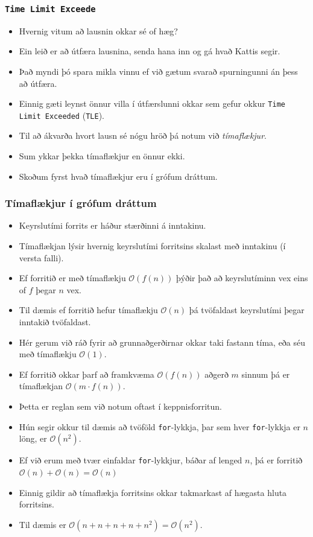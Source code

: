 \documentclass[handout]{beamer}
\newcommand\env[2]
{
	\begin{#1}
	#2
	\end{#1}
}
\begin{document}
\env{frame}
{
	\frametitle{\texttt{Time Limit Exceede}}
	\env{itemize}
	{
		\item<1-> Hvernig vitum að lausnin okkar sé of hæg?
		\item<2-> Ein leið er að útfæra lausnina, senda hana inn og gá hvað Kattis segir.
		\item<3-> Það myndi þó spara mikla vinnu ef við gætum svarað spurningunni án þess að útfæra.
		\item<4-> Einnig gæti leynst önnur villa í útfærslunni okkar sem gefur okkur \texttt{Time Limit Exceeded} (\texttt{TLE}).
		\item<5-> Til að ákvarða hvort lausn sé nógu hröð þá notum við \emph{tímaflækjur}.
		\item<6-> Sum ykkar þekka tímaflækjur en önnur ekki.
		\item<7-> Skoðum fyrst hvað tímaflækjur eru í grófum dráttum.
	}
}

\env{frame}
{
	\frametitle{Tímaflækjur í grófum dráttum}
	\env{itemize}
	{
		\item<1-> Keyrslutími forrits er háður stærðinni á inntakinu.
		\item<2-> Tímaflækjan lýsir hvernig keyrslutími forritsins skalast með inntakinu (í versta falli).
		\item<3-> Ef forritið er með tímaflækju $\mathcal{O}(f(n))$ þýðir það að keyrslutíminn vex eins of $f$ þegar $n$ vex.
		\item<4-> Til dæmis ef forritið hefur tímaflækju $\mathcal{O}(n)$ þá tvöfaldast keyrslutími þegar inntakið tvöfaldast.
		\item<5-> Hér gerum við ráð fyrir að grunnaðgerðirnar okkar taki fastann tíma, eða séu með tímaflækju $\mathcal{O}(1)$.
	}
}

\env{frame}
{
	\env{itemize}
	{
		\item<1-> Ef forritið okkar þarf að framkvæma $\mathcal{O}(f(n))$ aðgerð $m$ sinnum þá er tímaflækjan $\mathcal{O}(m \cdot f(n))$.
		\item<2-> Þetta er reglan sem við notum oftast í keppnisforritun.
		\item<3-> Hún segir okkur til dæmis að tvöföld \texttt{for}-lykkja, þar sem hver \texttt{for}-lykkja er $n$ löng, er $\mathcal{O}(n^2)$.
		\item<4-> Ef við erum með tvær einfaldar \texttt{for}-lykkjur, báðar af lenged $n$, þá er forritið 
			$\mathcal{O}(n) + \mathcal{O}(n) = \mathcal{O}(n)$
		\item<5-> Einnig gildir að tímaflækja forritsins okkar takmarkast af hægasta hluta forritsins.
		\item<6-> Til dæmis er
			$\mathcal{O}(n + n + n + n + n^2) = \mathcal{O}(n^2)$.
	}
}
\end{document}
